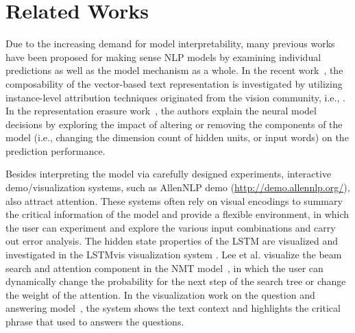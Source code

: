 \section{Related Works}
Due to the increasing demand for model interpretability, many previous works have been proposed for making sense NLP models by examining individual predictions as well as the model mechanism as a whole. 
%
In the recent work~\cite{LiChenHovy2015}, the composability of the vector-based text representation is investigated by utilizing instance-level attribution techniques originated from the vision community, i.e., \cite{ZeilerFergus2014}. 
%
In the representation erasure work~\cite{li2016understanding}, the authors explain the neural model decisions by exploring the impact of altering or removing the components of the model (i.e., changing the dimension count of hidden units, or input words) on the prediction performance. 

Besides interpreting the model via carefully designed experiments, interactive demo/visualization systems, such as AllenNLP demo (\url{http://demo.allennlp.org/}), also attract attention. These systems often rely on visual encodings to summary the critical information of the model and provide a flexible environment, in which the user can experiment and explore the various input combinations and carry out error analysis.
The hidden state properties of the LSTM are visualized and investigated in the LSTMvis visualization system \cite{StrobeltGehrmannPfister2018}.
Lee et al. visualize the beam search and attention component in the NMT model~\cite{lee2017interactive},  in which the user can dynamically change the probability for the next step of the search tree or change the weight of the attention.
In the visualization work on the question and answering model~\cite{ruckle2017end}, the system shows the text context and highlights the critical phrase that used to answers the questions. 

